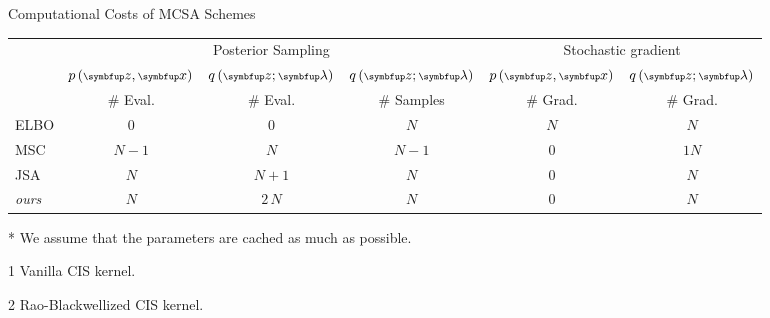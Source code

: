 
\caption{Computational Costs of MCSA Schemes}\label{table:cost}
\setlength{\tabcolsep}{1pt}
  \begin{threeparttable}
\begin{tabular}{lccccc}\toprule
& \multicolumn{3}{c}{\footnotesize Posterior Sampling} & \multicolumn{2}{c}{\footnotesize Stochastic gradient} \\
\cmidrule(lr){2-4}\cmidrule(lr){5-6}
  & \(\scriptsize p\left( \vz, \vx \right)\)
  & \(\scriptsize q\left(\vz; \vlambda\right)\)
  & \(\scriptsize q\left(\vz; \vlambda\right)\)
  & \(\scriptsize p\left( \vz, \vx \right)\)
  & \(\scriptsize q\left(\vz; \vlambda\right)\)
  \\
  & {\footnotesize\# Eval.  }
  & {\footnotesize\# Eval.  }
  & {\footnotesize\# Samples}
  & {\footnotesize\# Grad.  }
  & {\footnotesize\# Grad.  }
%
\\\midrule
%
{\footnotesize
ELBO
}
& \(0\)
& \(0\)
& \(N\)
& \(N\)
& \(N\)
\\\arrayrulecolor{black!30}\midrule
%
{\footnotesize
MSC
}
& \(N-1\)
& \(N\)
& \(N-1\)
& \(0\)
& \(1\)\tnote{1}\;\;{\footnotesize or}\;\(N\)\tnote{2}
\\
%
{\footnotesize
JSA
}
& \(N\)
& \(N+1\)
& \(N\)
& \(0\)
& \(N\)
\\
%
{\footnotesize
\textit{ours}
}
& \(N\)
& \(2 \, N\)
& \(N\)
& \(0\)
& \(N\)
\\\bottomrule
\end{tabular}
  \begin{tablenotes}
    \item[*]{\footnotesize We assume that the parameters are cached as much as possible}.
    \item[1]{\footnotesize Vanilla CIS kernel}.
    \item[2]{\footnotesize Rao-Blackwellized CIS kernel}.
  \end{tablenotes}
  \end{threeparttable}
